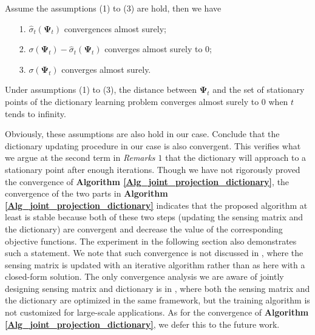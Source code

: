 \documentclass[final,5p,times,twocolumn]{elsarticle}
\begin{document}
\begin{prop}
	\label{prop:decrease_func}
	\cite[Propostion 2]{MBPS10}
	Assume the assumptions (1) to (3) are hold, then we have
	\vspace{-0.25cm}
	\begin{itemize}
		\item[1.] ${\hat \sigma_t(\bm\Psi_t)}$ convergences almost surely;
		\vspace{-0.25cm}
		\item[2.] $\sigma(\bm\Psi_t)-{\hat \sigma_t(\bm\Psi_t)}$ converges almost surely to $0$;
		\vspace{-0.25cm}
		\item[3.] $\sigma(\bm\Psi_t)$ converges almost surely.
	\end{itemize}
\end{prop}


\begin{prop}
	\label{prop:dic_dif}
	\cite[Propostion 3]{MBPS10}
	Under assumptions (1) to (3), the distance between $\bm \Psi_t$ and the set of stationary points of the dictionary learning problem converges almost surely to 0 when $t$ tends to infinity.
\end{prop}
Obviously, these assumptions are also hold in our case. Conclude that the dictionary updating procedure in our case is also convergent. This verifies what we argue at the second term in {\emph{Remarks $1$}} that the dictionary will approach to a stationary point after enough iterations. {Though we have not rigorously proved the convergence of {\bf Algorithm \ref{Alg_joint_projection_dictionary}}, the convergence of the two parts in {\bf Algorithm \ref{Alg_joint_projection_dictionary}} indicates that the proposed algorithm at least is stable because both of these two steps (updating the sensing matrix and the dictionary) are convergent and decrease the value of the corresponding objective functions. The experiment in the following section also demonstrates such a statement. We note that such convergence is not discussed in \cite{DCS09,BLLLJC15}, where the sensing matrix is updated with an iterative algorithm rather than as here with a closed-form solution. The only convergence analysis we are aware of jointly designing sensing matrix and dictionary is in \cite{Li2018joint}, where both the sensing matrix and the dictionary are optimized in the same framework, but the training algorithm is not customized for large-scale applications. As for the convergence of {\bf Algorithm \ref{Alg_joint_projection_dictionary}}, we defer this to the future work.}
\end{document}

